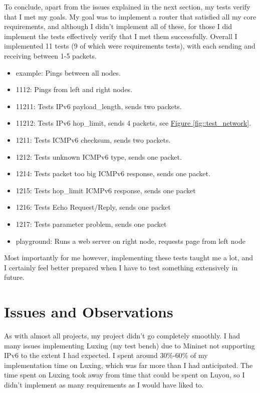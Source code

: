 \documentclass[12pt,a4paper,twoside,openany]{report}
\begin{document}
To conclude, apart from the issues explained in the next section, my tests verify that I met my goals.  My goal was to implement a router that satisfied all my core requirements, and although I didn't implement all of these, for those I did implement the tests effectively verify that I met them successfully.  Overall I implemented 11 tests (9 of which were requirements tests), with each sending and receiving between 1-5 packets. 
\begin{itemize}
\item example: Pings between all nodes.
\item 1112: Pings from left and right nodes.
\item 11211: Tests IPv6 payload\_length, sends two packets.
\item 11212: Tests IPv6 hop\_limit, sends 4 packets, see \hyperref[fig::test_success]{Figure }\ref{fig::test_network}.
\item 1211: Tests ICMPv6 checksum, sends two packets.
\item 1212: Tests unknown ICMPv6 type, sends one packet.
\item 1214: Tests packet too big ICMPv6 response, sends one packet.
\item 1215: Tests hop\_limit ICMPv6 response, sends one packet
\item 1216: Tests Echo Request/Reply, sends one packet
\item 1217: Tests parameter problem, sends one packet
\item playground: Runs a web server on right node, requests page from left node
\end{itemize}
Most importantly for me however, implementing these tests taught me a lot, and I certainly feel better prepared when I have to test something extensively in future.

\section{Issues and Observations}

As with almost all projects, my project didn't go completely smoothly. I had many issues implementing Luxing (my test bench) due to Mininet not supporting IPv6 to the extent I had expected. I spent around 30\%-60\% of my implementation time on Luxing, which was far more than I had anticipated. The time spent on Luxing took away from time that could be spent on Luyou, so I didn't implement as many requirements as I would have liked to.
\end{document}
